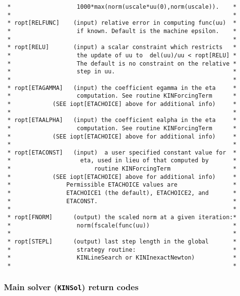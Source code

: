 \begin{verbatim}
 *                   1000*max(norm(uscale*uu(0),norm(uscale)).    *
 *                                                                *
 * ropt[RELFUNC]    (input) relative error in computing func(uu)  *
 *                   if known. Default is the machine epsilon.    *
 *                                                                *
 * ropt[RELU]       (input) a scalar constraint which restricts   *
 *                   the update of uu to  del(uu)/uu < ropt[RELU] *
 *                   The default is no constraint on the relative *
 *                   step in uu.                                  *
 *                                                                *
 * ropt[ETAGAMMA]   (input) the coefficient egamma in the eta     *
 *                   computation. See routine KINForcingTerm      *
 *            (SEE iopt[ETACHOICE] above for additional info)     *
 *                                                                *
 * ropt[ETAALPHA]   (input) the coefficient ealpha in the eta     *
 *                   computation. See routine KINForcingTerm      *
 *            (SEE iopt[ETACHOICE] above for additional info)     *
 *                                                                *
 * ropt[ETACONST]   (input)  a user specified constant value for  *
 *                    eta, used in lieu of that computed by       *
 *                        routine KINForcingTerm                  *
 *            (SEE iopt[ETACHOICE] above for additional info)     *
 *                Permissible ETACHOICE values are                *
 *                ETACHOICE1 (the default), ETACHOICE2, and       *
 *                ETACONST.                                       *
 *                                                                *
 * ropt[FNORM]      (output) the scaled norm at a given iteration:*
 *                   norm(fscale(func(uu))                        *
 *                                                                *
 * ropt[STEPL]      (output) last step length in the global       *
 *                   strategy routine:                            *
 *                   KINLineSearch or KINInexactNewton)           *
 *                                                                *

\end{verbatim}
\normalsize

\subsubsection{Main solver ({\tt KINSol}) return codes}

